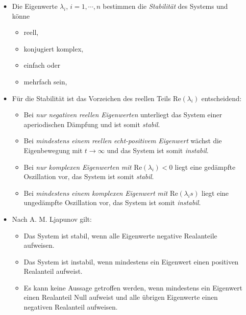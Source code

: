 \documentclass[a4paper, 11pt, accentcolor = tud3b]{tudreport}
\renewcommand{\Re}{\text{Re}}
\begin{document}
                \begin{itemize}
                	\item Die Eigenwerte \( \lambda _ i \), \( i = 1, \cdots, n \) bestimmen die \textit{Stabilität} des Systems und könne
	                	\begin{itemize}
	                		\item reell,
	                		\item konjugiert komplex,
	                		\item einfach oder
	                		\item mehrfach sein,
	                	\end{itemize}
	                \item Für die Stabilität ist das Vorzeichen des reellen Teils \( \Re(\lambda _ i) \) entscheidend:
		                \begin{itemize}
		                	\item Bei \textit{nur negativen reellen Eigenwerten} unterliegt das System einer aperiodischen Dämpfung und ist somit \textit{stabil}.
		                	\item Bei \textit{mindestens einem reellen echt-positivem Eigenwert} wächst die Eigenbewegung mit \( t \rightarrow \infty \) und das System ist somit \textit{instabil}.
		                	\item Bei \textit{nur komplexen Eigenwerten mit \( \Re(\lambda _ i) < 0 \)} liegt eine gedämpfte Oszillation vor, das System ist somit \textit{stabil}.
		                	\item Bei \textit{mindestens einem komplexen Eigenwert mit \( \Re(\lambda _ is) \)} liegt eine ungedämpfte Oszillation vor, das System ist somit \textit{instabil}.
		                \end{itemize}
		            \item Nach A. M. Ljapunov gilt:
			            \begin{itemize}
			            	\item Das System ist stabil, wenn alle Eigenwerte negative Realanteile aufweisen.
			            	\item Das System ist instabil, wenn mindestens ein Eigenwert einen positiven Realanteil aufweist.
			            	\item Es kann keine Aussage getroffen werden, wenn mindestens ein Eigenwert einen Realanteil Null aufweist und alle übrigen Eigenwerte einen negativen Realanteil aufweisen.
			            \end{itemize}
                \end{itemize}
            
\end{document}
